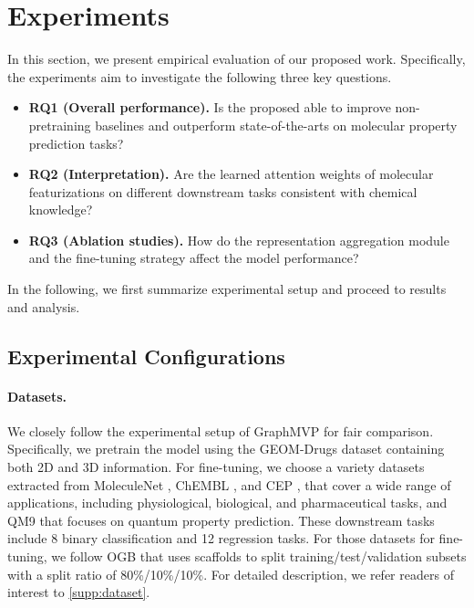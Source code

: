 \section{Experiments}

In this section, we present empirical evaluation of our proposed work.
Specifically, the experiments aim to investigate the following three key questions.
\begin{itemize}
	\item \textbf{RQ1 (Overall performance).} Is the proposed \themodel able to improve non-pretraining baselines and outperform state-of-the-arts on molecular property prediction tasks?
	\item \textbf{RQ2 (Interpretation).} Are the learned attention weights of molecular featurizations on different downstream tasks consistent with chemical knowledge?
	\item \textbf{RQ3 (Ablation studies).} How do the representation aggregation module and the fine-tuning strategy affect the model performance?
\end{itemize}
In the following, we first summarize experimental setup and proceed to results and analysis.

\subsection{Experimental Configurations}

\paragraph{Datasets.}
We closely follow the experimental setup of GraphMVP \cite{Liu:2022vr} for fair comparison.
Specifically, we pretrain the model using the GEOM-Drugs dataset \cite{Axelrod:2022da} containing both 2D and 3D information.
For fine-tuning, we choose a variety datasets extracted from MoleculeNet \cite{Wu:2018dv}, ChEMBL \cite{Gaulton:2011ch}, and CEP \cite{Hachmann:2011ce}, that cover a wide range of applications, including physiological, biological, and pharmaceutical tasks, and QM9 \cite{Ramakrishnan:2014ij} that focuses on quantum property prediction.
These downstream tasks include 8 binary classification and 12 regression tasks.
For those datasets for fine-tuning, we follow OGB \cite{Hu:2020wv} that uses scaffolds to split training/test/validation subsets with a split ratio of 80\%/10\%/10\%.
For detailed description, we refer readers of interest to \cref{supp:dataset}.

